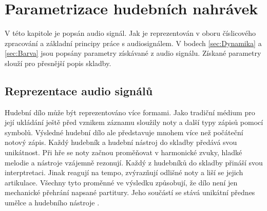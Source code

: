 
  \section{Parametrizace hudebních nahrávek} \label{sec:Parametrizace}
  V této kapitole je popsán audio signál. Jak je reprezentován v oboru číslicového zpracování a základní principy práce s audiosignálem.
  V bodech \ref{sec:Dynamika} a \ref{sec:Barva} jsou popsány parametry získávané z audio signálu.
  Získané parametry slouží pro přesnější popis skladby.

  \subsection{Reprezentace audio signálů} \label{sec:Audio}
  Hudební dílo může být reprezentováno více formami.
  Jako tradiční médium pro její ukládání ještě před vznikem záznamu sloužily noty a další typy zápisů pomocí symbolů.
  Výsledné hudební dílo ale představuje mnohem více než počáteční notový zápis.
  Každý hudebník a hudební nástroj do skladby předává svou unikátnost.
  Při hře se noty začnou proměňovat v harmonické zvuky, hladké melodie a nástroje vzájemně rezonují. 
  Každý z hudebníků do skladby přináší svou interptretaci. Jinak reagují na tempo, zvýrazňují odlišné noty a liší se jejich artikulace.
  Všechny tyto proměnné ve výsledku způsobují, že dílo není jen mechanické přehrání napsané partitury.
  Jeho součástí se stává unikátní přednes umělce a hudebního nástroje \cite{fundamental_of_music_processing}.

